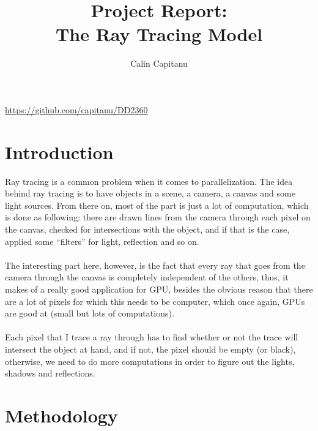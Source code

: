 \documentclass[english]{exam}
\begin{document}
\title{Project Report: \\ The Ray Tracing Model}
\author{Calin Capitanu}

\maketitle
\begin{center}
  \url{https://github.com/capitanu/DD2360} \\
\end{center}

\section*{Introduction}

Ray tracing is a common problem when it comes to parallelization. The idea behind ray tracing is to have objects in a scene, a camera, a canvas and some light sources. From there on, most of the part is just a lot of computation, which is done as following: there are drawn lines from the camera through each pixel on the canvas, checked for intersections with the object, and if that is the case, applied some ``filters'' for light, reflection and so on.
\\\\
The interesting part here, however, is the fact that every ray that goes from the camera through the canvas is completely independent of the others, thus, it makes of a really good application for GPU, besides the obvious reason that there are a lot of pixels for which this needs to be computer, which once again, GPUs are good at (small but lots of computations).
\\\\
Each pixel that I trace a ray through has to find whether or not the trace will intersect the object at hand, and if not, the pixel should be empty (or black), otherwise, we need to do more computations in order to figure out the lights, shadows and reflections. \cite{ray-1}

\section*{Methodology}
\end{document}
